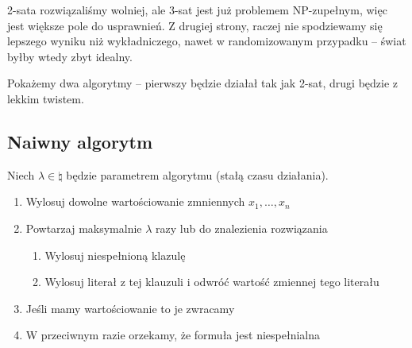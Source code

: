 2-sata rozwiązaliśmy wolniej, ale 3-sat jest już problemem NP-zupełnym, więc jest większe pole do usprawnień. Z drugiej strony, raczej nie spodziewamy się lepszego wyniku niż wykładniczego, nawet w randomizowanym przypadku -- świat byłby wtedy zbyt idealny.

Pokażemy dwa algorytmy -- pierwszy będzie działał tak jak 2-sat, drugi będzie z lekkim twistem.

\subsection{Naiwny algorytm}
\label{3-sat-naive-algorithm}
Niech \( \lambda \in \natural \) będzie parametrem algorytmu (stałą czasu działania).
\begin{enumerate}
    \item Wylosuj dowolne wartościowanie zmniennych \( x_1, \dots, x_n \)
    \item Powtarzaj maksymalnie \( \lambda \) razy lub do znalezienia rozwiązania
    \begin{enumerate}
        \item Wylosuj niespełnioną klazulę
        \item Wylosuj literał z tej klauzuli i odwróć wartość zmiennej tego literału
    \end{enumerate}
    \item Jeśli mamy wartościowanie to je zwracamy
    \item W przeciwnym razie orzekamy, że formuła jest niespełnialna
\end{enumerate}

